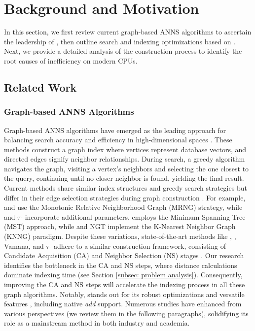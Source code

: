 \section{Background and Motivation}
\label{sec: background}
In this section, we first review current graph-based ANNS algorithms to ascertain the leadership of , then outline search and indexing optimizations based on . Next, we provide a detailed analysis of the  construction process to identify the root causes of inefficiency on modern CPUs.

\subsection{Related Work}
\label{subsec: Related Work}

\subsubsection{\textbf{Graph-based ANNS Algorithms}}
\label{subsubsec: Graph ANNS Alg}
Graph-based ANNS algorithms have emerged as the leading approach for balancing search accuracy and efficiency in high-dimensional spaces \cite{graph_survey_vldb2021,DPG,DiskANN,tau-MG,NSSG,RoarGraph}. These methods construct a graph index where vertices represent database vectors, and directed edges signify neighbor relationships. During search, a greedy algorithm navigates the graph, visiting a vertex's neighbors and selecting the one closest to the query, continuing until no closer neighbor is found, yielding the final result.
Current methods share similar index structures and greedy search strategies but differ in their edge selection strategies during graph construction \cite{graph_survey_vldb2021}. For example,  \cite{HNSW} and  \cite{NSG} use the Monotonic Relative Neighborhood Graph (MRNG) strategy, while  \cite{DiskANN} and $\tau$- \cite{tau-MG} incorporate additional parameters.  \cite{HCNNG} employs the Minimum Spanning Tree (MST) approach, while  \cite{NNDescent} and NGT \cite{NGT} implement the K-Nearest Neighbor Graph (KNNG) paradigm. {Despite these variations, state-of-the-art methods like , , Vamana, and $\tau$- adhere to a similar construction framework, consisting of Candidate Acquisition (CA) and Neighbor Selection (NS) stages \cite{NSG,tau-MG}.} {Our research identifies the bottleneck in the CA and NS steps, where distance calculations dominate indexing time (see Section \ref{subsec: problem analysis}). Consequently, improving the CA and NS steps will accelerate the indexing process in all these graph algorithms.} Notably,  stands out for its robust optimizations and versatile features \cite{Finger,ZuoQZLD24,LiuZHSLLDYW22}, including native \textit{add} support. Numerous studies have enhanced  from various perspectives (we review them in the following paragraphs), solidifying its role as a mainstream method in both industry and academia.

